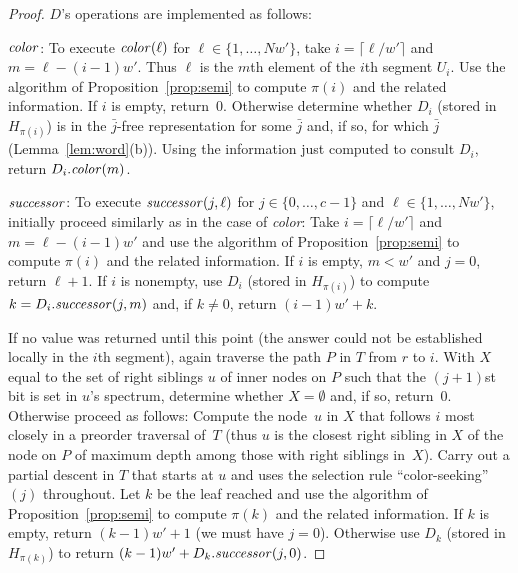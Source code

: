 \documentclass[envcountsame,envcountsect,undated,nolinenumbers]{lnthi}
\def\Tvn#1{\hbox{\textit{#1\/}}}
\def\Tceil#1{\lceil #1\rceil}
\def\jj{{\bar j}}
\begin{document}
\begin{proof}
\noindent
$D$'s operations are implemented as follows:

\medskip\noindent
$\Tvn{color}$:
To execute $\Tvn{color}(\ell)$
for $\ell\in\{1,\ldots,N w'\}$, take
$i=\Tceil{{\ell/{w'}}}$ and $m=\ell-(i-1)w'$.
Thus $\ell$ is the $m$th element of the
$i$th segment $U_i$.
Use the algorithm of
Proposition~\ref{prop:semi} to compute
$\pi(i)$ and the related information.
If $i$ is empty, return~0.
Otherwise determine whether $D_i$
(stored in $H_{\pi(i)}$) is
in the $\jj$-free representation for some
$\jj$ and, if so, for which $\jj$
(Lemma~\ref{lem:word}(b)).
Using the information just computed to
consult $D_i$,
return $D_i.\Tvn{color}(m)$.

\medskip\noindent
$\Tvn{successor}$:
To execute $\Tvn{successor}(j,\ell)$
for $j\in\{0,\ldots,c-1\}$ and $\ell\in\{1,\ldots,N w'\}$,
initially proceed similarly as in
the case of \Tvn{color}:
Take $i=\Tceil{{\ell/{w'}}}$ and $m=\ell-(i-1)w'$
and use the algorithm of
Proposition~\ref{prop:semi} to compute
$\pi(i)$ and the related information.
If $i$ is empty, $m<w'$ and $j=0$,
return $\ell+1$.
If $i$ is nonempty, 
use $D_i$ (stored in $H_{\pi(i)}$) to
compute $k=D_i.\Tvn{successor}(j,m)$
and, if $k\not=0$, return $(i-1)w'+k$.

If no value was returned until this point
(the answer could not be established locally
in the $i$th segment),
again traverse the path $P$ in $T$ from $r$ to $i$.
With $X$ equal to the set of right siblings $u$
of inner nodes on $P$ 
such that the $(j+1)$st bit is set in $u$'s spectrum,
determine whether
$X=\emptyset$ and, if so, return~0.
Otherwise proceed as follows:
Compute the node~$u$
in $X$ that follows $i$ most closely in
a preorder traversal of~$T$
(thus $u$ is the closest right sibling in $X$
of the node on $P$ of maximum depth among
those with right siblings in~$X$).
Carry out a partial descent in $T$ that starts
at $u$ and uses the selection rule
``color-seeking''$(j)$ throughout.
Let $k$ be the leaf reached and
use the algorithm of
Proposition~\ref{prop:semi} to compute $\pi(k)$
and the related information.
If $k$ is empty, return $(k-1)w'+1$
(we must have $j=0$).
Otherwise use $D_k$ (stored in $H_{\pi(k)}$) to return
$(k-1)w'+D_k.\Tvn{successor}(j,0)$.


\end{proof}
\end{document}

